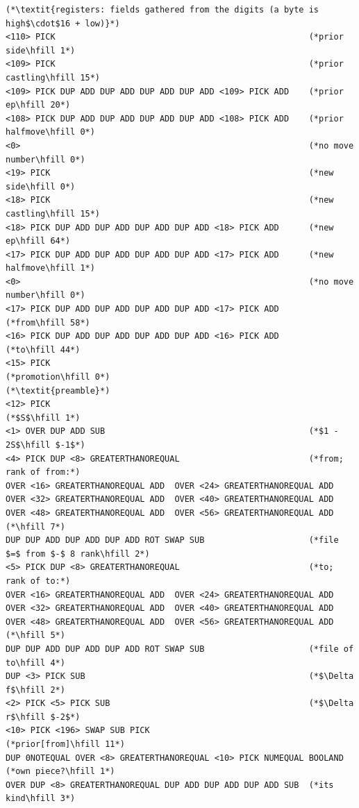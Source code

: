 \documentclass[11pt]{article}
\begin{document}
\begin{lstlisting}[style=script]
(*\textit{registers: fields gathered from the digits (a byte is high$\cdot$16 + low)}*)
<110> PICK                                                   (*prior side\hfill 1*)
<109> PICK                                                   (*prior castling\hfill 15*)
<109> PICK DUP ADD DUP ADD DUP ADD DUP ADD <109> PICK ADD    (*prior ep\hfill 20*)
<108> PICK DUP ADD DUP ADD DUP ADD DUP ADD <108> PICK ADD    (*prior halfmove\hfill 0*)
<0>                                                          (*no move number\hfill 0*)
<19> PICK                                                    (*new side\hfill 0*)
<18> PICK                                                    (*new castling\hfill 15*)
<18> PICK DUP ADD DUP ADD DUP ADD DUP ADD <18> PICK ADD      (*new ep\hfill 64*)
<17> PICK DUP ADD DUP ADD DUP ADD DUP ADD <17> PICK ADD      (*new halfmove\hfill 1*)
<0>                                                          (*no move number\hfill 0*)
<17> PICK DUP ADD DUP ADD DUP ADD DUP ADD <17> PICK ADD      (*from\hfill 58*)
<16> PICK DUP ADD DUP ADD DUP ADD DUP ADD <16> PICK ADD      (*to\hfill 44*)
<15> PICK                                                    (*promotion\hfill 0*)
(*\textit{preamble}*)
<12> PICK                                                    (*$S$\hfill 1*)
<1> OVER DUP ADD SUB                                         (*$1 - 2S$\hfill $-1$*)
<4> PICK DUP <8> GREATERTHANOREQUAL                          (*from; rank of from:*)
OVER <16> GREATERTHANOREQUAL ADD  OVER <24> GREATERTHANOREQUAL ADD
OVER <32> GREATERTHANOREQUAL ADD  OVER <40> GREATERTHANOREQUAL ADD
OVER <48> GREATERTHANOREQUAL ADD  OVER <56> GREATERTHANOREQUAL ADD  (*\hfill 7*)
DUP DUP ADD DUP ADD DUP ADD ROT SWAP SUB                     (*file $=$ from $-$ 8 rank\hfill 2*)
<5> PICK DUP <8> GREATERTHANOREQUAL                          (*to; rank of to:*)
OVER <16> GREATERTHANOREQUAL ADD  OVER <24> GREATERTHANOREQUAL ADD
OVER <32> GREATERTHANOREQUAL ADD  OVER <40> GREATERTHANOREQUAL ADD
OVER <48> GREATERTHANOREQUAL ADD  OVER <56> GREATERTHANOREQUAL ADD  (*\hfill 5*)
DUP DUP ADD DUP ADD DUP ADD ROT SWAP SUB                     (*file of to\hfill 4*)
DUP <3> PICK SUB                                             (*$\Delta f$\hfill 2*)
<2> PICK <5> PICK SUB                                        (*$\Delta r$\hfill $-2$*)
<10> PICK <196> SWAP SUB PICK                                (*prior[from]\hfill 11*)
DUP 0NOTEQUAL OVER <8> GREATERTHANOREQUAL <10> PICK NUMEQUAL BOOLAND (*own piece?\hfill 1*)
OVER DUP <8> GREATERTHANOREQUAL DUP ADD DUP ADD DUP ADD SUB  (*its kind\hfill 3*)

\end{lstlisting}
\end{document}
